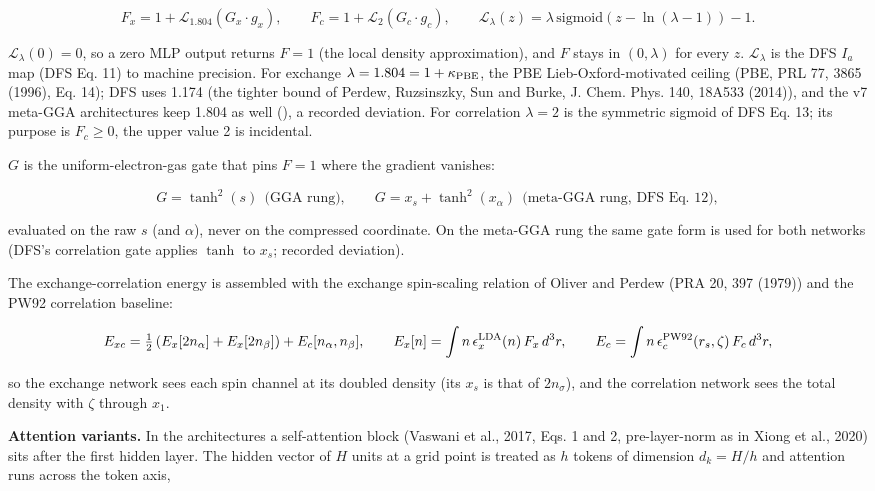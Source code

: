 \documentclass[10pt,a4paper]{article}
\begin{document}
\[
F_x = 1 + \mathcal{L}_{1.804}\!\left(G_x \cdot g_x\right), \qquad
F_c = 1 + \mathcal{L}_{2}\!\left(G_c \cdot g_c\right), \qquad
\mathcal{L}_{\lambda}(z) = \lambda\,\mathrm{sigmoid}\!\left(z - \ln(\lambda - 1)\right) - 1.
\]

$\mathcal{L}_\lambda(0) = 0$, so a zero MLP output returns $F = 1$ (the local density approximation), and $F$ stays in $(0, \lambda)$ for every $z$. $\mathcal{L}_\lambda$ is the DFS $I_a$ map (DFS Eq. 11) to machine precision. For exchange $\lambda = 1.804 = 1 + \kappa_{\rm PBE}$, the PBE Lieb-Oxford-motivated ceiling (PBE, PRL 77, 3865 (1996), Eq. 14); DFS uses 1.174 (the tighter bound of Perdew, Ruzsinszky, Sun and Burke, J. Chem. Phys. 140, 18A533 (2014)), and the v7 meta-GGA architectures keep 1.804 as well (), a recorded deviation. For correlation $\lambda = 2$ is the symmetric sigmoid of DFS Eq. 13; its purpose is $F_c \ge 0$, the upper value 2 is incidental.

$G$ is the uniform-electron-gas gate that pins $F = 1$ where the gradient vanishes:

\[
G = \tanh^2(s) \ \ \text{(GGA rung)}, \qquad
G = x_s + \tanh^2(x_\alpha) \ \ \text{(meta-GGA rung, DFS Eq. 12)},
\]

evaluated on the raw $s$ (and $\alpha$), never on the compressed coordinate. On the meta-GGA rung the same gate form is used for both networks (DFS's correlation gate applies $\tanh$ to $x_s$; recorded deviation).

The exchange-correlation energy is assembled with the exchange spin-scaling relation of Oliver and Perdew (PRA 20, 397 (1979)) and the PW92 correlation baseline:

\[
E_{xc} = \tfrac12\left(E_x[2 n_\alpha] + E_x[2 n_\beta]\right) + E_c[n_\alpha, n_\beta], \qquad
E_x[n] = \int n\, \epsilon_x^{\rm LDA}(n)\, F_x\, d^3r, \qquad
E_c = \int n\, \epsilon_c^{\rm PW92}(r_s, \zeta)\, F_c\, d^3r,
\]

so the exchange network sees each spin channel at its doubled density (its $x_s$ is that of $2 n_\sigma$), and the correlation network sees the total density with $\zeta$ through $x_1$.

\textbf{Attention variants.} In the  architectures a self-attention block (Vaswani et al., 2017, Eqs. 1 and 2, pre-layer-norm as in Xiong et al., 2020) sits after the first hidden layer. The hidden vector of $H$ units at a grid point is treated as $h$ tokens of dimension $d_k = H/h$ and attention runs across the token axis,
\end{document}
